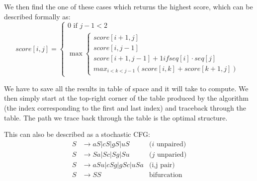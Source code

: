     We then find the one of these cases which returns the highest score, which 
    can be described formally as:
    \begin{equation*}
        score[i,j]=\begin{cases}
        0\text{ if }j-1<2\\
        \max\begin{cases}
        score[i+1,j]\\
        score[i, j-1]\\
        score[i+1, j-1]+1 if seq[i]\cdot seq[j]\\
        max_{i<k<j-1}(score[i,k]+score[k+1,j])
        \end{cases}
        \end{cases}
    \end{equation*}
    
    We have to save all the results in table of space  and it will 
    take  to compute. We then simply start at the top-right corner of 
    the table produced by the algorithm (the index corresponding to the first 
    and last index) and traceback through the table. The path we trace back 
    through the table is the optimal structure.
    
    This can also be described as a stochastic CFG:
    \begin{align*}
        S &\rightarrow aS|cS|gS|uS &\text{($i$ unpaired)}\\
        S &\rightarrow Sa|Sc|Sg|Su &\text{($j$ unparied)}\\
        S &\rightarrow aSu|cSg|gSc|uSa &\text{(i,j pair)}\\
        S &\rightarrow SS &\text{bifurcation}
    \end{align*}
